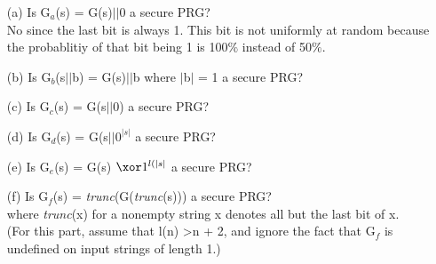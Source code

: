 
\begin{itemize}
\item[(a)]
	Is G\(_{a}\)(s) = G(s)\(\vert \vert\)0 a secure PRG? \\
	No since the last bit is always 1. This bit is not uniformly at random because the probablitiy of that bit being 1 is 100\(\%\) instead of 50\(\%\). \\
\item[(b)]
	Is G\(_{b}\)(s\(\vert \vert\)b) = G(s)\(\vert \vert\)b where \(\vert\)b\(\vert\) = 1 a secure PRG? \\
	
\item[(c)]
	Is G\(_{c}\)(s) = G(s\(\vert \vert\)0) a secure PRG? \\
	
\item[(d)]
	Is G\(_{d}\)(s) = G(s\(\vert \vert\)\(0^{\vert s \vert}\) a secure PRG? \\
\item[(e)]
	Is G\(_{e}\)(s) = G(s) \(\xor 1^{ l(\vert s \vert}\) a secure PRG? \\
\item[(f)]
	Is G\(_{f}\)(s) = \textit{trunc}(G(\textit{trunc}(s))) a secure PRG? \\
	where \textit{trunc}(x) for a nonempty string x denotes all but the last bit of x. \\
	(For this part, assume that l(n) \textgreater  n + 2, and ignore the fact that G\(_{f}\) is undefined on input strings of length 1.) \\
\end{itemize}
